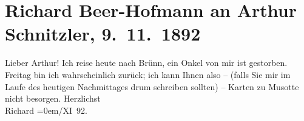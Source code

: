 

         
         \newcommand{\erwaehntePersonen}{Personen: Moritz E. Schwarz}
         \newcommand{\erwaehnteInstitutionen}{}
         \newcommand{\erwaehnteOrte}{Orte: Brünn, Wien}
         \newcommand{\erwaehnteWerke}{Werke: Musotte}
               \section[Richard Beer-Hofmann an Arthur Schnitzler, 9. 11. 1892]{ Richard Beer-Hofmann an Arthur Schnitzler, 9. 11. 1892}\nopagebreak{}\rehead{ }\begin{ledgroupsized}[t]{13cm}\normalsize\beginnumbering \toendnotes[C]{\smallbreak\pagebreak[2]} 
\toendnotes[C]{\smallbreak}\pstart{}{\pb}Lieber Arthur!\pend\pstart
           Ich reise heute nach Brünn, ein Onkel von mir ist gestorben.\pend
           \pstart
           Freitag bin ich wahrscheinlich zurück; ich kann Ihnen also – (falls {\pb}Sie mir im Laufe des heutigen
               Nachmittages drum schreiben sollten) – Karten zu Musotte nicht besorgen.\pend
           \pstart
           Herzlichst{\\[\baselineskip]}\spacefill\mbox{Richard}\pend
           \leftskip=0em{}/XI 92.\pend
           
         
         \endnumbering{}\end{ledgroupsized}  \newcommand{\dateiname}{L00134}\newcommand{\titel}{Richard Beer-Hofmann an Arthur Schnitzler, 9. 11. 1892}\newcommand{\editorInnen}{Martin Anton Müller und Gerd-Hermann Susen}
      